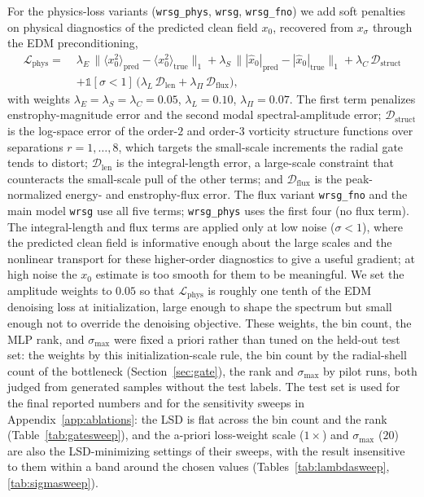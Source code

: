 \documentclass[10pt]{article} %
\begin{document}
For the physics-loss variants (\texttt{wrsg\_phys}, \texttt{wrsg}, \texttt{wrsg\_fno}) we add soft penalties on physical diagnostics of the predicted clean field $x_0$, recovered from $x_\sigma$ through the EDM preconditioning,
\begin{align}
\mathcal{L}_{\text{phys}} = \;& \lambda_E \,\big\| \langle x_0^2 \rangle_{\text{pred}} - \langle x_0^2 \rangle_{\text{true}} \big\|_1
+ \lambda_S \,\big\| |\hat{x}_0|_{\text{pred}} - |\hat{x}_0|_{\text{true}} \big\|_1
+ \lambda_C \, \mathcal{D}_{\text{struct}} \nonumber \\
& + \mathbb{1}[\sigma < 1]\,\big( \lambda_L \, \mathcal{D}_{\text{len}} + \lambda_\Pi \, \mathcal{D}_{\text{flux}} \big),
\label{eq:phys}
\end{align}
with weights $\lambda_E = \lambda_S = \lambda_C = 0.05$, $\lambda_L = 0.10$, $\lambda_\Pi = 0.07$. The first term penalizes enstrophy-magnitude error and the second modal spectral-amplitude error; $\mathcal{D}_{\text{struct}}$ is the log-space error of the order-$2$ and order-$3$ vorticity structure functions over separations $r = 1, \dots, 8$, which targets the small-scale increments the radial gate tends to distort; $\mathcal{D}_{\text{len}}$ is the integral-length error, a large-scale constraint that counteracts the small-scale pull of the other terms; and $\mathcal{D}_{\text{flux}}$ is the peak-normalized energy- and enstrophy-flux error. The flux variant \texttt{wrsg\_fno} and the main model \texttt{wrsg} use all five terms; \texttt{wrsg\_phys} uses the first four (no flux term). The integral-length and flux terms are applied only at low noise ($\sigma < 1$), where the predicted clean field is informative enough about the large scales and the nonlinear transport for these higher-order diagnostics to give a useful gradient; at high noise the $x_0$ estimate is too smooth for them to be meaningful. We set the amplitude weights to $0.05$ so that $\mathcal{L}_{\text{phys}}$ is roughly one tenth of the EDM denoising loss at initialization, large enough to shape the spectrum but small enough not to override the denoising objective. These weights, the bin count, the MLP rank, and $\sigma_{\max}$ were fixed a priori rather than tuned on the held-out test set: the weights by this initialization-scale rule, the bin count by the radial-shell count of the bottleneck (Section~\ref{sec:gate}), the rank and $\sigma_{\max}$ by pilot runs, both judged from generated samples without the test labels. The test set is used for the final reported numbers and for the sensitivity sweeps in Appendix~\ref{app:ablations}: the LSD is flat across the bin count and the rank (Table~\ref{tab:gatesweep}), and the a-priori loss-weight scale ($1\times$) and $\sigma_{\max}$ ($20$) are also the LSD-minimizing settings of their sweeps, with the result insensitive to them within a band around the chosen values (Tables~\ref{tab:lambdasweep}, \ref{tab:sigmasweep}).
\end{document}
